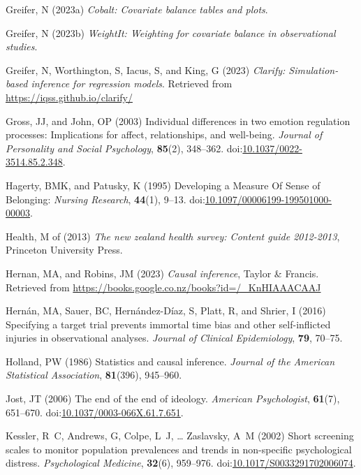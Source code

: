 \documentclass[
  singlecolumn,
  9pt]{article}
\newlength{\cslhangindent}
\newenvironment{CSLReferences}[2] %
 {\begin{list}{}{%
  \setlength{\itemindent}{0pt}
  \setlength{\leftmargin}{0pt}
  \setlength{\parsep}{0pt}
  \ifodd #1
   \setlength{\leftmargin}{\cslhangindent}
   \setlength{\itemindent}{-1\cslhangindent}
  \fi
  \setlength{\itemsep}{#2\baselineskip}}}
 {\end{list}}
\begin{document}
\begin{CSLReferences}{1}{0}
Greifer, N (2023a) \emph{Cobalt: Covariate balance tables and plots}.

Greifer, N (2023b) \emph{WeightIt: Weighting for covariate balance in
observational studies}.

Greifer, N, Worthington, S, Iacus, S, and King, G (2023) \emph{Clarify:
Simulation-based inference for regression models}. Retrieved from
\url{https://iqss.github.io/clarify/}

Gross, JJ, and John, OP (2003) Individual differences in two emotion
regulation processes: Implications for affect, relationships, and
well-being. \emph{Journal of Personality and Social Psychology},
\textbf{85}(2), 348--362.
doi:\href{https://doi.org/10.1037/0022-3514.85.2.348}{10.1037/0022-3514.85.2.348}.

Hagerty, BMK, and Patusky, K (1995) Developing a Measure Of Sense of
Belonging: \emph{Nursing Research}, \textbf{44}(1), 9--13.
doi:\href{https://doi.org/10.1097/00006199-199501000-00003}{10.1097/00006199-199501000-00003}.

Health, M of (2013) \emph{The new zealand health survey: Content guide
2012-2013}, Princeton University Press.

Hernan, MA, and Robins, JM (2023) \emph{Causal inference}, Taylor \&
Francis. Retrieved from
\url{https://books.google.co.nz/books?id=/_KnHIAAACAAJ}

Hernán, MA, Sauer, BC, Hernández-Díaz, S, Platt, R, and Shrier, I (2016)
Specifying a target trial prevents immortal time bias and other
self-inflicted injuries in observational analyses. \emph{Journal of
Clinical Epidemiology}, \textbf{79}, 70--75.

Holland, PW (1986) Statistics and causal inference. \emph{Journal of the
American Statistical Association}, \textbf{81}(396), 945--960.

Jost, JT (2006) The end of the end of ideology. \emph{American
Psychologist}, \textbf{61}(7), 651--670.
doi:\href{https://doi.org/10.1037/0003-066X.61.7.651}{10.1037/0003-066X.61.7.651}.

Kessler, R~C, Andrews, G, Colpe, L~J, \ldots{} Zaslavsky, A~M (2002)
Short screening scales to monitor population prevalences and trends in
non-specific psychological distress. \emph{Psychological Medicine},
\textbf{32}(6), 959--976.
doi:\href{https://doi.org/10.1017/S0033291702006074}{10.1017/S0033291702006074}.


\end{CSLReferences}
\end{document}
